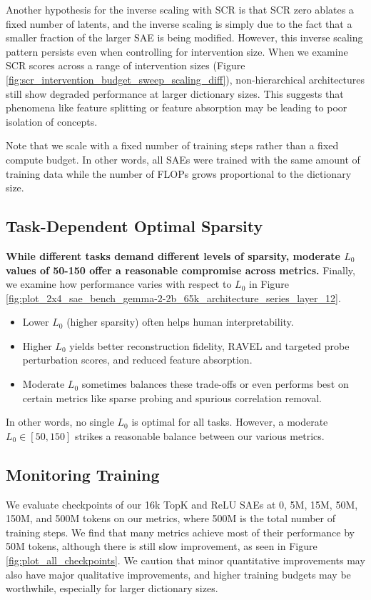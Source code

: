 \documentclass{article}
\theoremstyle{plain}
\theoremstyle{definition}
\theoremstyle{remark}
\begin{document}
Another hypothesis for the inverse scaling with SCR is that SCR zero ablates a fixed number of latents, and the inverse scaling is simply due to the fact that a smaller fraction of the larger SAE is being modified. However, this inverse scaling pattern persists even when controlling for intervention size. When we examine SCR scores across a range of intervention sizes (Figure \ref{fig:scr_intervention_budget_sweep_scaling_diff}), non-hierarchical architectures still show degraded performance at larger dictionary sizes. This suggests that phenomena like feature splitting or feature absorption may be leading to poor isolation of concepts.

Note that we scale with a fixed number of training steps rather than a fixed compute budget. In other words, all SAEs were trained with the same amount of training data while the number of FLOPs grows proportional to the dictionary size.

\subsection{Task-Dependent Optimal Sparsity}
\textbf{While different tasks demand different levels of sparsity, moderate $L_0$ values of 50-150 offer a reasonable compromise across metrics.}
Finally, we examine how performance varies with respect to $L_0$ in Figure \ref{fig:plot_2x4_sae_bench_gemma-2-2b_65k_architecture_series_layer_12}.
\begin{itemize}
    \item Lower $L_0$ (higher sparsity) often helps human interpretability.
    \item Higher $L_0$ yields better reconstruction fidelity, RAVEL and targeted probe perturbation scores, and reduced feature absorption.
    \item Moderate $L_0$ sometimes balances these trade-offs or even performs best on certain metrics like sparse probing and spurious correlation removal.
\end{itemize}

In other words, no single $L_0$ is optimal for all tasks. However, a moderate $L_0 \in [50, 150]$ strikes a reasonable balance between our various metrics.

\subsection{Monitoring Training}
We evaluate checkpoints of our 16k TopK and ReLU SAEs at 0, 5M, 15M, 50M, 150M, and 500M tokens on our metrics, where 500M is the total number of training steps. We find that many metrics achieve most of their performance by 50M tokens, although there is still slow improvement, as seen in Figure \ref{fig:plot_all_checkpoints}. We caution that minor quantitative improvements may also have major qualitative improvements, and higher training budgets may be worthwhile, especially for larger dictionary sizes.
\end{document}
